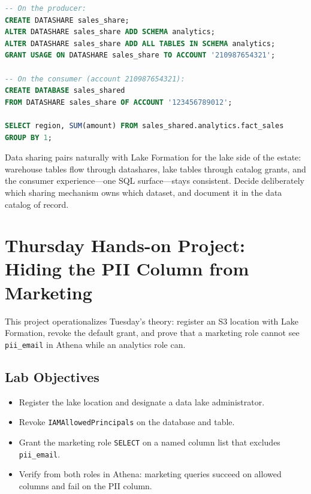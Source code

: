 \begin{lstlisting}[language=SQL,caption={Producer and consumer steps for a cross-account datashare.},label={lst:ch8-datashare}]
-- On the producer:
CREATE DATASHARE sales_share;
ALTER DATASHARE sales_share ADD SCHEMA analytics;
ALTER DATASHARE sales_share ADD ALL TABLES IN SCHEMA analytics;
GRANT USAGE ON DATASHARE sales_share TO ACCOUNT '210987654321';

-- On the consumer (account 210987654321):
CREATE DATABASE sales_shared
FROM DATASHARE sales_share OF ACCOUNT '123456789012';

SELECT region, SUM(amount) FROM sales_shared.analytics.fact_sales
GROUP BY 1;
\end{lstlisting}

\begin{tipbox}
Data sharing pairs naturally with Lake Formation for the lake side of the estate: warehouse tables flow through datashares, lake tables through catalog grants, and the consumer experience---one SQL surface---stays consistent. Decide deliberately which sharing mechanism owns which dataset, and document it in the data catalog of record.
\end{tipbox}

\section{Thursday Hands-on Project: Hiding the PII Column from Marketing}
This project operationalizes Tuesday's theory: register an S3 location with Lake Formation, revoke the default grant, and prove that a marketing role cannot see \texttt{pii\_email} in Athena while an analytics role can.

\subsection*{Lab Objectives}
\begin{itemize}
    \item Register the lake location and designate a data lake administrator.
    \item Revoke \texttt{IAMAllowedPrincipals} on the database and table.
    \item Grant the marketing role \texttt{SELECT} on a named column list that excludes \texttt{pii\_email}.
    \item Verify from both roles in Athena: marketing queries succeed on allowed columns and fail on the PII column.
\end{itemize}

